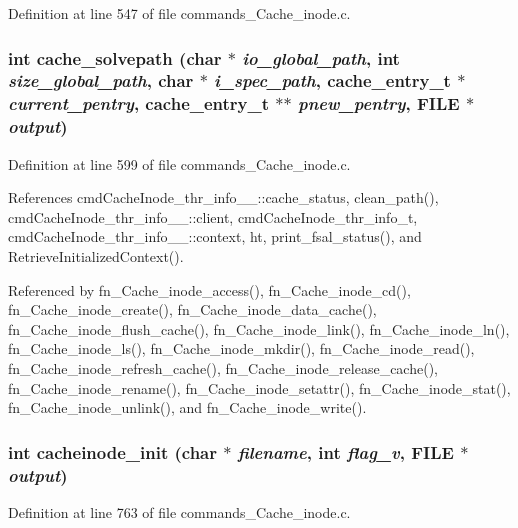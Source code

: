 Definition at line 547 of file commands\_\-Cache\_\-inode.c.
\subsubsection{\setlength{\rightskip}{0pt plus 5cm}int cache\_\-solvepath (char $\ast$ {\em io\_\-global\_\-path}, int {\em size\_\-global\_\-path}, char $\ast$ {\em i\_\-spec\_\-path}, cache\_\-entry\_\-t $\ast$ {\em current\_\-pentry}, cache\_\-entry\_\-t $\ast$$\ast$ {\em pnew\_\-pentry}, FILE $\ast$ {\em output})}\label{commands__Cache__inode_8c_a26}




Definition at line 599 of file commands\_\-Cache\_\-inode.c.

References cmd\-Cache\-Inode\_\-thr\_\-info\_\-\_\-::cache\_\-status, clean\_\-path(), cmd\-Cache\-Inode\_\-thr\_\-info\_\-\_\-::client, cmd\-Cache\-Inode\_\-thr\_\-info\_\-t, cmd\-Cache\-Inode\_\-thr\_\-info\_\-\_\-::context, ht, print\_\-fsal\_\-status(), and Retrieve\-Initialized\-Context().

Referenced by fn\_\-Cache\_\-inode\_\-access(), fn\_\-Cache\_\-inode\_\-cd(), fn\_\-Cache\_\-inode\_\-create(), fn\_\-Cache\_\-inode\_\-data\_\-cache(), fn\_\-Cache\_\-inode\_\-flush\_\-cache(), fn\_\-Cache\_\-inode\_\-link(), fn\_\-Cache\_\-inode\_\-ln(), fn\_\-Cache\_\-inode\_\-ls(), fn\_\-Cache\_\-inode\_\-mkdir(), fn\_\-Cache\_\-inode\_\-read(), fn\_\-Cache\_\-inode\_\-refresh\_\-cache(), fn\_\-Cache\_\-inode\_\-release\_\-cache(), fn\_\-Cache\_\-inode\_\-rename(), fn\_\-Cache\_\-inode\_\-setattr(), fn\_\-Cache\_\-inode\_\-stat(), fn\_\-Cache\_\-inode\_\-unlink(), and fn\_\-Cache\_\-inode\_\-write().
\subsubsection{\setlength{\rightskip}{0pt plus 5cm}int cacheinode\_\-init (char $\ast$ {\em filename}, int {\em flag\_\-v}, FILE $\ast$ {\em output})}\label{commands__Cache__inode_8c_a27}




Definition at line 763 of file commands\_\-Cache\_\-inode.c.

